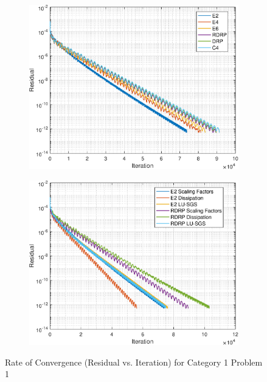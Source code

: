 \documentclass[conf]{new-aiaa}
\begin{document}
\begin{figure}
\centering
\begin{subfigure}{0.5\textwidth}
  \centering
  \includegraphics[width=1.0\linewidth]{C1P1_TriDi_Scaling_ROC}
  \label{fig:Residual_Iteration_C1P1}
\end{subfigure}%
\begin{subfigure}{0.5\textwidth}
  \centering
  \includegraphics[width=1.0\linewidth]{C1P1_ROC_E2_vs_RDRP}
  \label{fig:C1P1_ROC_E2_vs_RDRP}
\end{subfigure}%
\caption{Rate of Convergence (Residual vs. Iteration) for Category 1 Problem 1}
\label{fig:C1P1_ROC}
\end{figure}
\end{document}
